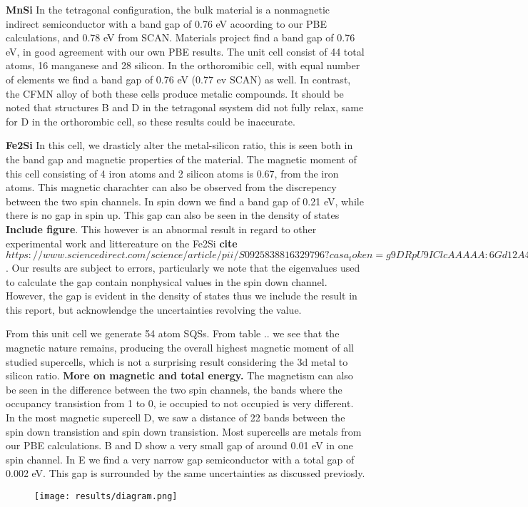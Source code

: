 \textbf{MnSi}
In the tetragonal configuration, the bulk material is a nonmagnetic indirect semiconductor with a band gap of 0.76 eV acoording to our PBE calculations,  and 0.78 eV from SCAN. Materials project find a band gap of 0.76 eV, in good agreement with our own PBE results. The unit cell consist of 44 total atoms, 16 manganese and 28 silicon. In the orthoromibic cell, with equal number of elements we find a band gap of 0.76 eV (0.77 ev SCAN) as well. In contrast, the CFMN alloy of both these cells produce metalic compounds. It should be noted that structures B and D in the tetragonal ssystem did not fully relax, same for D in the orthorombic cell, so these results could be inaccurate.   

\textbf{Fe2Si}
In this cell, we drasticly alter the metal-silicon ratio, this is seen both in the band gap and magnetic properties of the material. The magnetic moment of this cell consisting of 4 iron atoms and 2 silicon atoms is 0.67, from the iron atoms. This magnetic charachter can also be observed from the discrepency between the two spin channels. In spin down we find a band gap of 0.21 eV, while there is no gap in spin up. This gap can also be seen in the density of states \textbf{Include figure}. This however is an abnormal result in regard to other experimental work and littereature on the Fe2Si \textbf{cite $https://www.sciencedirect.com/science/article/pii/S0925838816329796?casa_token=g9DRpU9IClcAAAAA:6Gd12A4Kh9J2igUWMVwHN8OSIKzD27VACA052FNsSAWhRY6PELWdVEPbiF8OtQ3eJEAbvQ8X0g$}. Our results are subject to errors, particularly we note that the eigenvalues used to calculate the gap contain nonphysical values in the spin down channel. However, the gap is evident in the density of states thus we include the result in this report, but acknowlendge the uncertainties revolving the value. 

From this unit cell we generate 54 atom SQSs. From table .. we see that the magnetic nature remains, producing the overall highest magnetic moment of all studied supercells, which is not a surprising result considering the 3d metal to silicon ratio. \textbf{More on magnetic and total energy.} The magnetism can also be seen in the difference between the two spin channels, the bands where the occupancy transistion from 1 to 0, ie occupied to not occupied is very different. In the most magnetic supercell D, we saw a distance of 22 bands between the spin down transistion and spin down transistion. Most supercells are metals from our PBE calculations. B and D show a very small gap of around 0.01 eV in one spin channel.  In E we find a very narrow gap semiconductor with a total gap of 0.002 eV. This gap is surrounded by the same uncertainties as discussed previosly.  

\begin{figure}[H]
\centering
\texttt{[image: results/diagram.png]}
\end{figure}